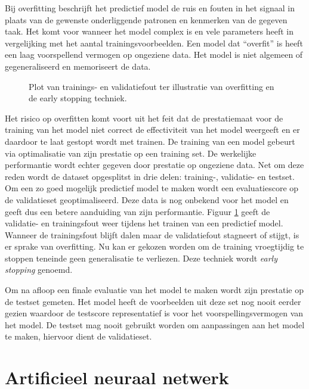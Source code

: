 \npar Bij overfitting beschrijft het predictief model de ruis en fouten in het signaal in plaats van de gewenste onderliggende patronen en kenmerken van de gegeven taak. Het komt voor wanneer het model complex is en vele parameters heeft in vergelijking met het aantal trainingsvoorbeelden. Een model dat ``overfit'' is heeft een laag voorspellend vermogen op ongeziene data. Het model is niet algemeen of gegeneraliseerd en  memoriseert de data. 

\begin{figure}
	\centering
	\def\svgscale{0.7}
	
	\caption{Plot van trainings- en validatiefout ter illustratie van overfitting en de early stopping techniek.}
	\label{fig:overfitting}
\end{figure}

\npar Het risico op overfitten komt voort uit het feit dat de prestatiemaat voor de training van het model niet correct de effectiviteit van het model weergeeft en er daardoor te laat gestopt wordt met trainen. De training van een model gebeurt via optimalisatie van zijn prestatie op een training set. De werkelijke performantie wordt echter gegeven door prestatie op ongeziene data. Net om deze reden wordt de dataset opgesplitst in drie delen: training-, validatie- en testset.
\npar Om een zo goed mogelijk predictief model te maken wordt een evaluatiescore op de validatieset geoptimaliseerd. Deze data is nog onbekend voor het model en geeft dus een betere aanduiding van zijn performantie. Figuur \ref{fig:overfitting} geeft de validatie- en trainingsfout weer tijdens het trainen van een predictief model. Wanneer de trainingsfout blijft dalen maar de validatiefout stagneert of stijgt, is er sprake van overfitting. Nu kan er gekozen worden om de training vroegtijdig te stoppen teneinde geen generalisatie te verliezen. Deze techniek wordt \textit{early stopping} genoemd.

\npar Om na afloop een finale evaluatie van het model te maken wordt zijn prestatie op de testset gemeten. Het model heeft de voorbeelden uit deze set nog nooit eerder gezien waardoor de testscore representatief is voor het voorspellingsvermogen van het model. De testset mag nooit gebruikt worden om aanpassingen aan het model te maken, hiervoor dient de validatieset.

\section{Artificieel neuraal netwerk}\label{sec:ann}
